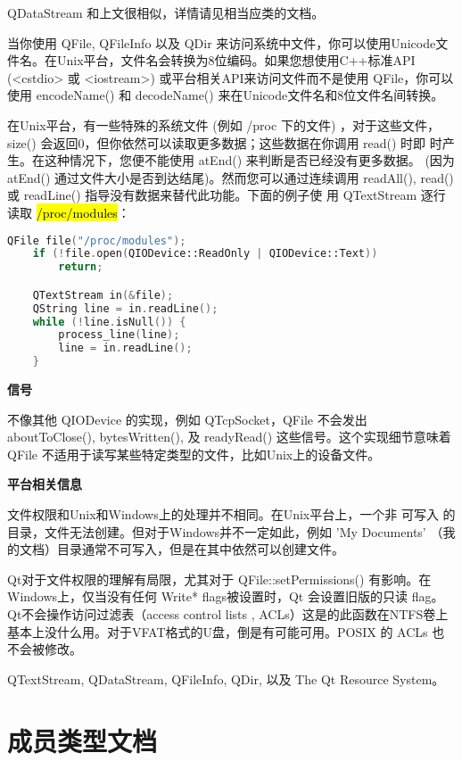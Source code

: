 QDataStream 和上文很相似，详情请见相当应类的文档。

当你使用 QFile, QFileInfo 以及 QDir 来访问系统中文件，你可以使用Unicode文件名。在Unix平台，文件名会转换为8位编码。如果您想使用C++标准API (<cstdio> 或 <iostream>) 或平台相关API来访问文件而不是使用 QFile，你可以使用 encodeName() 和 decodeName() 来在Unicode文件名和8位文件名间转换。

在Unix平台，有一些特殊的系统文件 (例如 /proc 下的文件) ，对于这些文件，
size() 会返回0，但你依然可以读取更多数据；这些数据在你调用 read() 时即
时产生。在这种情况下，您便不能使用 atEnd() 来判断是否已经没有更多数据。
(因为 atEnd() 通过文件大小是否到达结尾)。然而您可以通过连续调用
readAll(), read() 或 readLine() 指导没有数据来替代此功能。下面的例子使
用 QTextStream 逐行读取 \hl{/proc/modules}：

\begin{lstlisting}[language=C++]
    QFile file("/proc/modules");
    if (!file.open(QIODevice::ReadOnly | QIODevice::Text))
        return;

    QTextStream in(&file);
    QString line = in.readLine();
    while (!line.isNull()) {
        process_line(line);
        line = in.readLine();
    }
\end{lstlisting}

\textbf{信号}

不像其他 QIODevice 的实现，例如 QTcpSocket，QFile 不会发出 aboutToClose(), bytesWritten(), 及 readyRead() 这些信号。这个实现细节意味着 QFile 不适用于读写某些特定类型的文件，比如Unix上的设备文件。

\textbf{平台相关信息}

文件权限和Unix和Windows上的处理并不相同。在Unix平台上，一个非 可写入 的目录，文件无法创建。但对于Windows并不一定如此，例如 'My Documents' （我的文档）目录通常不可写入，但是在其中依然可以创建文件。

Qt对于文件权限的理解有局限，尤其对于 QFile::setPermissions() 有影响。在Windows上，仅当没有任何 Write* flags被设置时，Qt 会设置旧版的只读 flag。Qt不会操作访问过滤表（access control lists , ACLs）这是的此函数在NTFS卷上基本上没什么用。对于VFAT格式的U盘，倒是有可能可用。POSIX 的 ACLs 也不会被修改。


\begin{notice}[另请参阅]
QTextStream, QDataStream, QFileInfo, QDir, 以及 The Qt
Resource System。
\end{notice} 

\splitLine

\section{成员类型文档}

